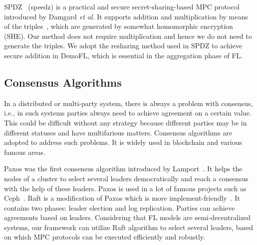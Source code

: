 SPDZ~\cite{SPDZ} (speedz) is a practical and secure secret-sharing-based MPC protocol introduced by Damgard \emph{et al}. It supports addition and multiplication by means of the triples~\cite{Triple}, which are generated by somewhat homomorphic encryption (SHE). Our method does not require multiplication and hence we do not need to generate the triples. We adopt the resharing method used in SPDZ to achieve secure addition in DemoFL, which is essential in the aggregation phase of FL.


\subsection{Consensus Algorithms}
In a distributed or multi-party system, there is always a problem with consensus, i.e., in such systems parties always need to achieve agreement on a certain value. This could be difficult without any strategy because different parties may be in different statuses and have multifarious matters. Consensus algorithms are adopted to address such problems. It is widely used in blockchain and various famous areas.

Paxos was the first consensus algorithm introduced by Lamport~\cite{Paxos}. It helps the nodes of a cluster to select several leaders democratically and reach a consensus with the help of these leaders. Paxos is used in a lot of famous projects such as Ceph~\cite{Ceph}. Raft is a modification of Paxos which is more implement-friendly~\cite{Raft}. It contains two phases: leader election and log replication. Parties can achieve agreements based on leaders. Considering that FL models are semi-decentralized systems, our framework can utilize Raft algorithm to select several leaders, based on which MPC protocols can be executed efficiently and robustly.